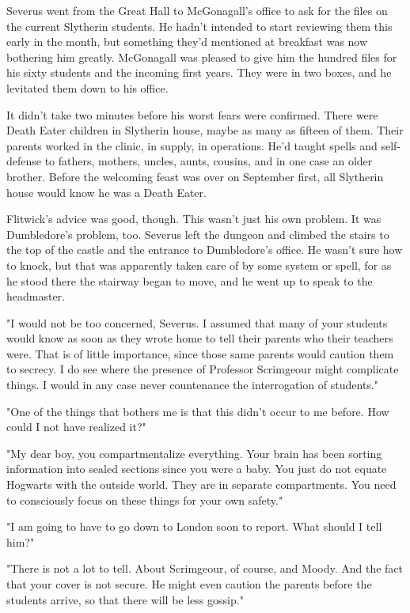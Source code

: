 Severus went from the Great Hall to McGonagall's office to ask for the files on the current Slytherin students. He hadn't intended to start reviewing them this early in the month, but something they'd mentioned at breakfast was now bothering him greatly. McGonagall was pleased to give him the hundred files for his sixty students and the incoming first years. They were in two boxes, and he levitated them down to his office.

It didn't take two minutes before his worst fears were confirmed. There were Death Eater children in Slytherin house, maybe as many as fifteen of them. Their parents worked in the clinic, in supply, in operations. He'd taught spells and self-defense to fathers, mothers, uncles, aunts, cousins, and in one case an older brother. Before the welcoming feast was over on September first, all Slytherin house would know he was a Death Eater.

Flitwick's advice was good, though. This wasn't just his own problem. It was Dumbledore's problem, too. Severus left the dungeon and climbed the stairs to the top of the castle and the entrance to Dumbledore's office. He wasn't sure how to knock, but that was apparently taken care of by some system or spell, for as he stood there the stairway began to move, and he went up to speak to the headmaster.

"I would not be too concerned, Severus. I assumed that many of your students would know as soon as they wrote home to tell their parents who their teachers were. That is of little importance, since those same parents would caution them to secrecy. I do see where the presence of Professor Scrimgeour might complicate things. I would in any case never countenance the interrogation of students."

"One of the things that bothers me is that this didn't occur to me before. How could I not have realized it?"

"My dear boy, you compartmentalize everything. Your brain has been sorting information into sealed sections since you were a baby. You just do not equate Hogwarts with the outside world. They are in separate compartments. You need to consciously focus on these things for your own safety."

"I am going to have to go down to London soon to report. What should I tell him?"

"There is not a lot to tell. About Scrimgeour, of course, and Moody. And the fact that your cover is not secure. He might even caution the parents before the students arrive, so that there will be less gossip."

